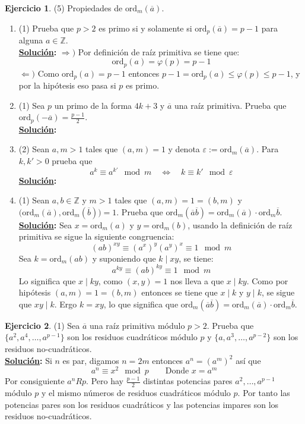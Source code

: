 \documentclass[11pt,letterpaper]{article}
\theoremstyle{definition}\newtheorem{p}{Ejercicio}
\newcommand{\Z}{\mathbb{Z}}
\newcommand{\sii}{\Longleftrightarrow}
\newcommand{\clase}[1]{\overline{#1}}  %
\newcommand{\ord}{\text{ord}}
\newcommand{\sol}{\textbf{\underline{Solución}: }} %
\begin{document}
\begin{p}(5)
Propiedades de $\ord_m(\clase{a})$.
\begin{enumerate}
  \item(1) Prueba que $p>2$ es primo si y solamente si $\ord_p(\clase{a})=p-1$ para alguna $a\in\Z$.\\
  \sol $\Longrightarrow) $ Por definición de raíz primitiva se tiene que:
  $$\ord_p(a) = \varphi(p) = p-1$$
  $\Longleftarrow) $ Como $\ord_p(a) = p-1$ entonces 
  $p-1 = \ord_p(a) \leq \varphi(p) \leq p-1$, y por la hipótesis eso pasa si $p$ es primo.
  
  \item(1) Sea $p$ un primo de la forma $4k+3$ y $\clase{a}$ una ra\'iz primitiva. Prueba que
  $\ord_p(-\clase{a})=\frac{p-1}{2}$.\\
  \sol

  \item(2) Sean $a,m>1$ tales que $(a,m)=1$ y denota $\varepsilon:=\ord_m(\clase{a})$. Para $k,k'>0$
  prueba que
  \[
    a^k\equiv a^{k'}\mod m \quad\sii\quad k\equiv k'\mod \varepsilon
  \]
  \sol

  \item(1) Sean $a,b\in\Z$ y $m>1$ tales que $(a,m)=1=(b,m)$ y
  $\big(\ord_m(\clase{a}),\ord_m(\clase{b})\big)=1$. Prueba que
  $\ord_m(\clase{a}\clase{b})=\ord_m(\clase{a})\cdot\ord_m\clase{b}$.\\
  \sol Sea $x = \ord_m(a)$ y $y = \ord_m(b)$, usando la definición de raíz primitiva
  se sigue la siguiente congruencia:
  \[
    (ab)^{xy} \equiv (a^x)^y (a^y)^x \equiv 1 \mod m
  \]
  Sea $k = \ord_m(ab)$ y suponiendo que $k \mid xy$, se tiene:
  \[
    a^{ky} \equiv (ab)^{ky} \equiv 1 \mod m
  \]
  Lo significa que $x \mid ky$, como $(x,y) = 1$ nos lleva a que $x \mid ky$. Como por 
  hipótesis $(a,m)=1=(b,m)$ entonces se tiene que
  $x \mid k$ y $y \mid k$, se sigue que $xy \mid k$. Ergo $k = xy$, lo que significa que
  $\ord_m(\clase{a}\clase{b})=\ord_m(\clase{a})\cdot\ord_m\clase{b}$.

\end{enumerate}
\end{p}


\begin{p}(1)
Sea $\clase{a}$ una ra\'iz primitiva m\'odulo $p>2$. Prueba que $\{a^2,a^4,\ldots,a^{p-1}\}$ son
los residuos cuadr\'aticos m\'odulo $p$ y $\{a,a^3,\ldots,a^{p-2}\}$ son los residuos
no-cuadr\'aticos.\\
\sol Si $n$ es par, digamos $n = 2m$ entonces $a^n = (a^m)^2$ así que
\[
  a^n \equiv x^2 \mod p \qquad \text{Donde } x=a^m  
\]
Por consiguiente $a^nRp$. Pero hay $\frac{p-1}{2}$ distintas potencias pares
$a^2, \ldots, a^{p-1}$ módulo $p$ y el mismo números de residuos cuadráticos módulo $p$. Por tanto
las potencias pares son los residuos cuadráticos y las potencias impares son los residuos
no-cuadráticos.
\end{p}
\end{document}
